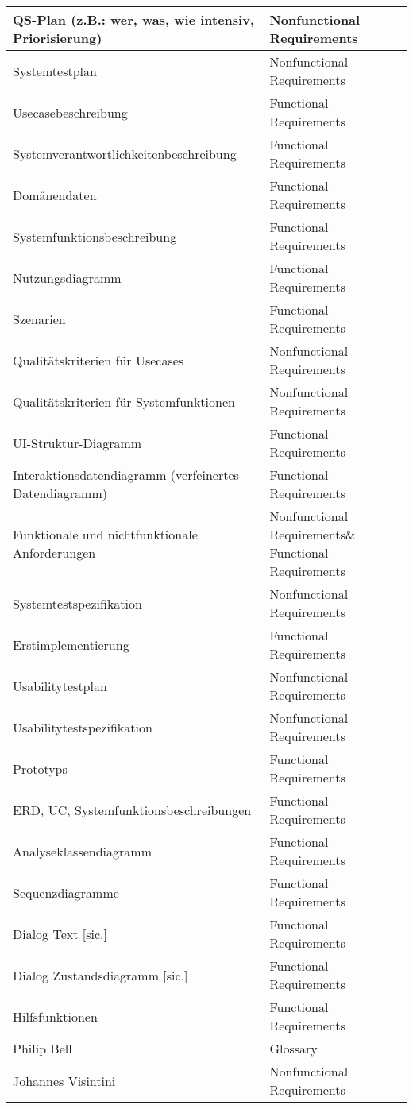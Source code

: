 \documentclass[ngerman]{scrartcl}
\newcommand{\f}{Functional Requirements}
\newcommand{\n}{Nonfunctional Requirements}
\newcommand{\g}{Glossary}
\begin{document}
\begin{tiny}
\begin{longtable}{|l|l|}
		\hline
		QS-Plan (z.B.: wer, was, wie intensiv, Priorisierung) & \n\\
		\hline
		Systemtestplan & \n\\
		\hline
		Usecasebeschreibung & \f\\
		\hline
		Systemverantwortlichkeitenbeschreibung & \f\\
		\hline
		Domänendaten & \f\\
		\hline
		Systemfunktionsbeschreibung & \f\\
		\hline
		Nutzungsdiagramm & \f\\
		\hline
		Szenarien & \f\\
		\hline
		Qualitätskriterien für Usecases & \n\\
		\hline
		Qualitätskriterien für Systemfunktionen & \n\\
		\hline
		UI-Struktur-Diagramm & \f\\
		\hline
		Interaktionsdatendiagramm (verfeinertes Datendiagramm)& \f\\
		\hline
		Funktionale und nichtfunktionale Anforderungen & \n \& \f\\
		\hline
		Systemtestspezifikation & \n\\
		\hline
		Erstimplementierung & \f\\
		\hline
		Usabilitytestplan & \n\\
		\hline
		Usabilitytestspezifikation & \n\\
		\hline
		Prototyps & \f\\
		\hline
		ERD, UC, Systemfunktionsbeschreibungen & \f\\
		\hline
		Analyseklassendiagramm & \f\\
		\hline
		Sequenzdiagramme & \f\\
		\hline
		Dialog Text [sic.] & \f\\
		\hline
		Dialog Zustandsdiagramm [sic.] & \f\\
		\hline
		Hilfsfunktionen & \f\\
		\hline
		Philip Bell & \g\\
		\hline
		Johannes Visintini & \n\\
		\hline
	\end{longtable}
	\end{tiny}
\end{document}

